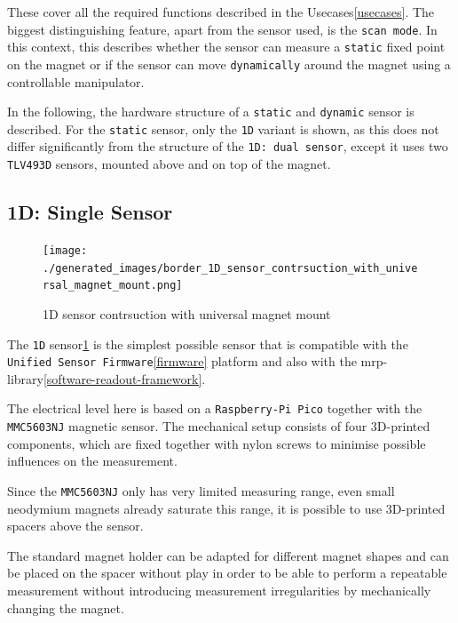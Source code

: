 These cover all the required functions described in the
Usecases\ref{usecases}. The biggest distinguishing feature, apart from
the sensor used, is the \passthrough{\lstinline!scan mode!}. In this
context, this describes whether the sensor can measure a
\passthrough{\lstinline!static!} fixed point on the magnet or if the
sensor can move \passthrough{\lstinline!dynamically!} around the magnet
using a controllable manipulator.

In the following, the hardware structure of a
\passthrough{\lstinline!static!} and \passthrough{\lstinline!dynamic!}
sensor is described. For the \passthrough{\lstinline!static!} sensor,
only the \passthrough{\lstinline!1D!} variant is shown, as this does not
differ significantly from the structure of the
\passthrough{\lstinline!1D: dual sensor!}, except it uses two
\passthrough{\lstinline!TLV493D!} sensors, mounted above and on top of
the magnet.

\hypertarget{d-single-sensor}{%
\subsection{1D: Single Sensor}\label{d-single-sensor}}

\begin{figure}
\centering
\texttt{[image: ./generated\_images/border\_1D\_sensor\_contrsuction\_with\_universal\_magnet\_mount.png]}
\caption{1D sensor contrsuction with universal magnet mount
\label{1D_sensor_contrsuction_with_universal_magnet_mount.png}}
\end{figure}

The \passthrough{\lstinline!1D!}
sensor\ref{1D_sensor_contrsuction_with_universal_magnet_mount.png} is
the simplest possible sensor that is compatible with the
\passthrough{\lstinline!Unified Sensor Firmware!}\ref{firmware} platform
and also with the \gls{mrp}-library\ref{software-readout-framework}.

The electrical level here is based on a
\passthrough{\lstinline!Raspberry-Pi Pico!} together with the
\passthrough{\lstinline!MMC5603NJ!} magnetic sensor. The mechanical
setup consists of four 3D-printed components, which are fixed together
with nylon screws to minimise possible influences on the measurement.

Since the \passthrough{\lstinline!MMC5603NJ!} only has very limited
measuring range, even small neodymium magnets already saturate this
range, it is possible to use 3D-printed spacers above the sensor.

The standard magnet holder can be adapted for different magnet shapes
and can be placed on the spacer without play in order to be able to
perform a repeatable measurement without introducing measurement
irregularities by mechanically changing the magnet.

